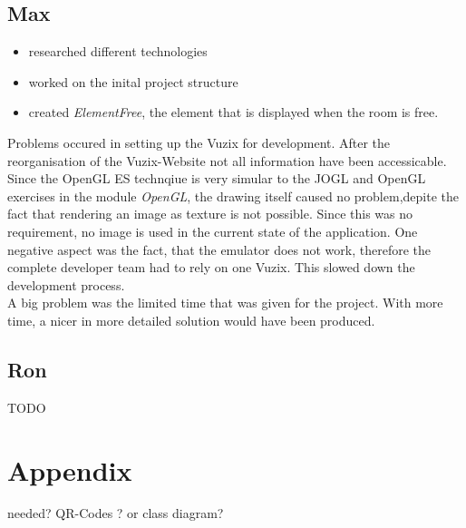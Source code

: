 \documentclass[11pt]{scrartcl}
\begin{document}
\begin{multicols}{2}
		\subsection{Max}
			\begin{itemize}
				\item researched different technologies
				\item worked on the inital project structure
				\item created \emph{ElementFree}, the element that is displayed when the room is free.
			\end{itemize}
			 Problems occured in setting up the Vuzix for development. After the reorganisation of the Vuzix-Website not all information have been accessicable. \\
			 Since the OpenGL ES technqiue is very simular to the JOGL and OpenGL exercises in the module \emph{OpenGL}, the drawing itself caused no problem,depite the fact that rendering an image as texture is not possible. Since this was no requirement, no image is used in the current state of the application.  One negative aspect was the fact, that the emulator does not work, therefore the complete developer team had to rely on one Vuzix. This slowed down the development process.\\
			 A big problem was the limited time that was given for the project.  With more time, a nicer in more detailed solution would have been produced.
		\subsection{Ron}
			TODO
\end{multicols}

\section*{Appendix}
needed? QR-Codes ? or class diagram?
\end{document}

